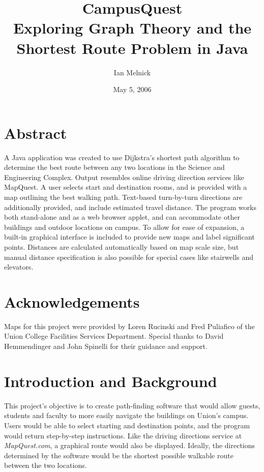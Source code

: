 \documentclass[12pt,letterpaper,titlepage]{article}   %
\title{CampusQuest\\
  {\small Exploring Graph Theory and the Shortest Route Problem in Java}}
\author{Ian Melnick}
\date{May 5, 2006}
\begin{document}
\maketitle
\begin{spacing}{0.9}
\tableofcontents
\end{spacing}

\newpage
\pagestyle{fancy} %
\doublespacing


\section{Abstract}

A Java application was created to use Dijkstra's shortest path algorithm
to determine the best route between any two locations in the Science and
Engineering Complex. Output resembles online driving direction services
like MapQuest. A user selects start and destination rooms, and is
provided with a map outlining the best walking path. Text-based
turn-by-turn directions are additionally provided, and include estimated
travel distance. The program works both stand-alone and as a web browser
applet, and can accommodate other buildings and outdoor locations on
campus. To allow for ease of expansion, a built-in graphical interface
is included to provide new maps and label significant points. Distances
are calculated automatically based on map scale size, but manual
distance specification is also possible for special cases like
stairwells and elevators.


\section{Acknowledgements}

Maps for this project were provided by Loren Rucinski and Fred Puliafico
of the Union College Facilities Services Department. Special thanks to
David Hemmendinger and John Spinelli for their guidance and support.


\newpage
\section{Introduction and Background}

This project's objective is to create path-finding software that would
allow guests, students and faculty to more easily navigate the buildings
on Union's campus. Users would be able to select starting and
destination points, and the program would return step-by-step
instructions. Like the driving directions service at \emph{MapQuest.com}, a
graphical route would also be displayed. Ideally, the directions
determined by the software would be the shortest possible walkable route
between the two locations.
\end{document}
